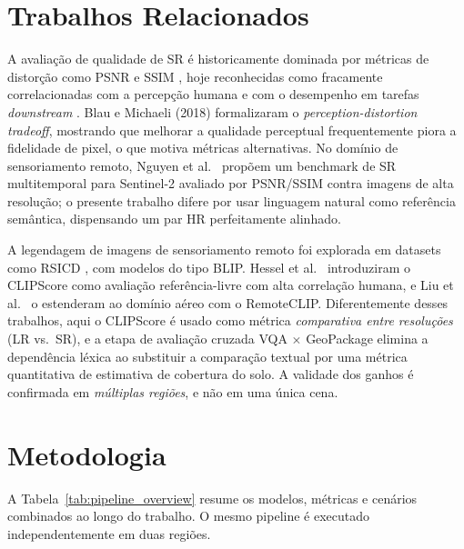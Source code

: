 \documentclass[12pt]{article}
\begin{document}
\section{Trabalhos Relacionados}

A avaliação de qualidade de SR é historicamente dominada por métricas de
distorção como PSNR e SSIM \cite{wang:2004}, hoje reconhecidas como
fracamente correlacionadas com a percepção humana e com o desempenho em
tarefas \textit{downstream} \cite{blau:2018}. Blau e Michaeli (2018)
formalizaram o \textit{perception-distortion tradeoff}, mostrando que
melhorar a qualidade perceptual frequentemente piora a fidelidade de
pixel, o que motiva métricas alternativas. No domínio de sensoriamento
remoto, Nguyen et al.\ \cite{nguyen:2021} propõem um benchmark de SR
multitemporal para Sentinel-2 avaliado por PSNR/SSIM contra imagens de
alta resolução; o presente trabalho difere por usar linguagem natural
como referência semântica, dispensando um par HR perfeitamente alinhado.

A legendagem de imagens de sensoriamento remoto foi explorada em datasets
como RSICD \cite{lu:2017}, com modelos do tipo BLIP. Hessel et al.\
\cite{hessel:2021} introduziram o CLIPScore como avaliação
referência-livre com alta correlação humana, e Liu et al.\ \cite{liu:2024}
o estenderam ao domínio aéreo com o RemoteCLIP. Diferentemente desses
trabalhos, aqui o CLIPScore é usado como métrica \emph{comparativa entre
resoluções} (LR vs.\ SR), e a etapa de avaliação cruzada VQA $\times$
GeoPackage elimina a dependência léxica ao substituir a comparação
textual por uma métrica quantitativa de estimativa de cobertura do solo.
A validade dos ganhos é confirmada em \emph{múltiplas regiões}, e não em
uma única cena.


\section{Metodologia}

A Tabela~\ref{tab:pipeline_overview} resume os modelos, métricas e
cenários combinados ao longo do trabalho. O mesmo pipeline é executado
independentemente em duas regiões.
\end{document}
